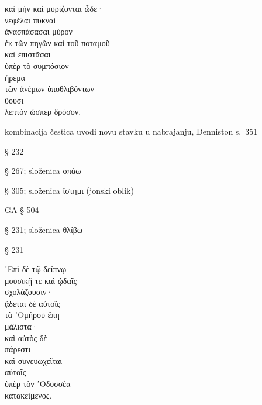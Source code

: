 {\large
\begin{greek}
\noindent καὶ μὴν καὶ μυρίζονται ὧδε· \\
νεφέλαι πυκναὶ \\
\tabto{2em} ἀνασπάσασαι μύρον \\
\tabto{4em} ἐκ τῶν πηγῶν καὶ τοῦ ποταμοῦ \\
\tabto{2em} καὶ ἐπιστᾶσαι \\
\tabto{4em} ὑπὲρ τὸ συμπόσιον \\
ἠρέμα \\
\tabto{2em} τῶν ἀνέμων ὑποθλιβόντων \\
ὕουσι \\
λεπτὸν ὥσπερ δρόσον.\\

\end{greek}
}

\begin{description}[noitemsep]
\item[καὶ μὴν καὶ] kombinacija čestica uvodi novu stavku u nabrajanju, Denniston s.~351
\item[μυρίζονται] § 232
\item[ἀνασπάσασαι] § 267; složenica σπάω
\item[ἐπιστᾶσαι] § 305; složenica ἵστημι (jonski oblik)
\item[τῶν ἀνέμων ὑποθλιβόντων] GA § 504
\item[ὑποθλιβόντων] § 231; složenica θλίβω
\item[ὕουσι] § 231
\end{description}




{\large
\begin{greek}
\noindent ᾿Επὶ δὲ τῷ δείπνῳ \\
\tabto{2em} μουσικῇ τε καὶ ᾠδαῖς \\
σχολάζουσιν· \\
ᾄδεται δὲ αὐτοῖς \\
τὰ ῾Ομήρου ἔπη \\
\tabto{2em} μάλιστα· \\
καὶ αὐτὸς δὲ \\
πάρεστι \\
καὶ συνευωχεῖται \\
\tabto{2em} αὐτοῖς \\
\tabto{2em} ὑπὲρ τὸν ᾿Οδυσσέα \\
κατακείμενος. \\

\end{greek}
}

